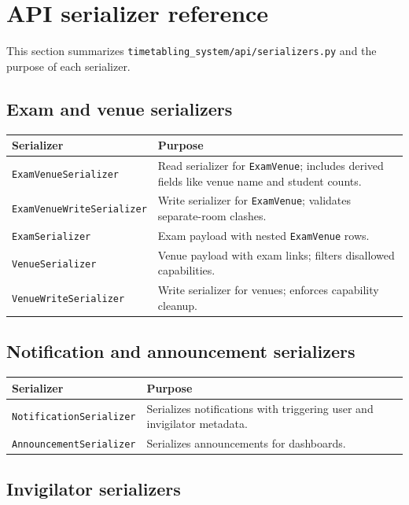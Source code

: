 \section{API serializer reference}
\label{sec:api:serializers:ref}

This section summarizes \texttt{timetabling\_system/api/serializers.py} and the purpose of each serializer.

\subsection{Exam and venue serializers}
\label{subsec:api:serializers:examvenue}

\begin{longtable}{p{}p{}}
\toprule
\textbf{Serializer} & \textbf{Purpose} \\
\midrule
\texttt{ExamVenueSerializer} & Read serializer for \texttt{ExamVenue}; includes derived fields like venue name and student counts. \\
\texttt{ExamVenueWriteSerializer} & Write serializer for \texttt{ExamVenue}; validates separate-room clashes. \\
\texttt{ExamSerializer} & Exam payload with nested \texttt{ExamVenue} rows. \\
\texttt{VenueSerializer} & Venue payload with exam links; filters disallowed capabilities. \\
\texttt{VenueWriteSerializer} & Write serializer for venues; enforces capability cleanup. \\
\bottomrule
\end{longtable}

\subsection{Notification and announcement serializers}
\label{subsec:api:serializers:notifications}

\begin{longtable}{p{}p{}}
\toprule
\textbf{Serializer} & \textbf{Purpose} \\
\midrule
\texttt{NotificationSerializer} & Serializes notifications with triggering user and invigilator metadata. \\
\texttt{AnnouncementSerializer} & Serializes announcements for dashboards. \\
\bottomrule
\end{longtable}

\subsection{Invigilator serializers}
\label{subsec:api:serializers:invigilators}

